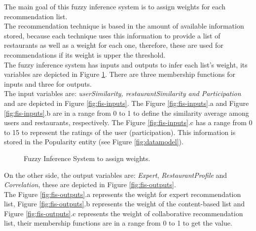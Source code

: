 The main goal of this fuzzy inference system is to assign weights for
each recommendation list.\\ The recommendation technique is based in the
amount of available information stored, because each technique uses
this information to provide a list of restaurants as well as a weight
for each one, therefore, these are used for  recommendations if its
weight is upper the threshold.  \\The fuzzy inference system has inputs
and outputs to infer each list's weight, its variables are depicted in
Figure  \ref{fig:fis-pesos}.  There are three membership functions for
inputs and three for outputs. \\The input variables are:
\textit{userSimilarity, restaurantSimilarity and Participation} and
are depicted in Figure  \ref{fig:fis-inputs}. The  Figure  \ref{fig:fis-inputs}.a
and  Figure  \ref{fig:fis-inputs}.b  are in a range from 0 to 1 to
define the similarity average among users and restaurants,
respectively. The Figure  \ref{fig:fis-inputs}.c has a range from 0
to 15  to represent the ratings of the user (participation). This
information is stored in the Popularity entity (see 
Figure  \ref{fig:datamodel}).
\begin{figure}
\captionsetup{justification=centering,margin=2cm,font=footnotesize}
\centering
{}
\caption{Fuzzy Inference System to assign weights.}
\label{fig:fis-pesos}       
\end{figure}
On the other side, the output variables are: 
\textit{Expert}, \textit{RestaurantProfile} and \textit{Correlation}, these are depicted in 
Figure  \ref{fig:fis-outputs}. \\The Figure  \ref{fig:fis-outputs}.a  represents
the weight for expert recommendation list, Figure  \ref{fig:fis-outputs}.b 
represents the weight of the content-based list and 
Figure  \ref{fig:fis-outputs}.c  represents the weight of collaborative
recommendation list, their membership functions are in a range from 0
to 1 to get the value.
